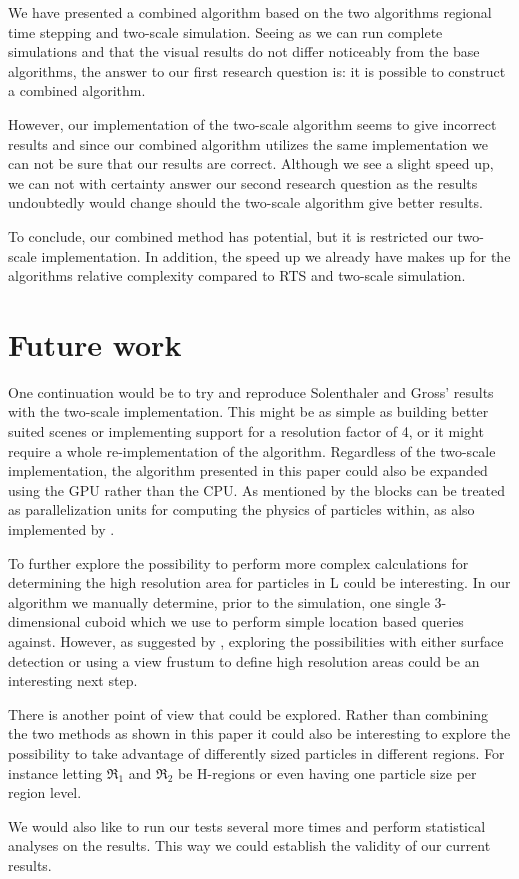 \documentclass[../../main.tex]{subfiles}
\begin{document}
\tracingall

We have presented a combined algorithm based on the two algorithms regional time stepping and two-scale simulation. Seeing as we can run complete simulations and that the visual results do not differ noticeably from the base algorithms, the answer to our first research question is: it is possible to construct a combined algorithm. 

However, our implementation of the two-scale algorithm seems to give incorrect results and since our combined algorithm utilizes the same implementation we can not be sure that our results are correct. Although we see a slight speed up, we can not with certainty answer our second research question as the results undoubtedly would change should the two-scale algorithm give better results. 

To conclude, our combined method has potential, but it is restricted our two-scale implementation. In addition, the speed up we already have makes up for the algorithms relative complexity compared to RTS and two-scale simulation. 


\section{Future work}

One continuation would be to try and reproduce Solenthaler and Gross' results with the two-scale implementation. This might be as simple as building better suited scenes or implementing support for a resolution factor of 4, or it might require a whole re-implementation of the algorithm. Regardless of the two-scale implementation, the algorithm presented in this paper could also be expanded using the GPU rather than the CPU. As mentioned by \citet{goswami2014regional} the blocks can be treated as parallelization units for computing the physics of particles within, as also implemented by \citet{goswami2010interactive}.

To further explore the possibility to perform more complex calculations for determining the high resolution area for particles in L could be interesting. In our algorithm we manually determine, prior to the simulation, one single 3-dimensional cuboid which we use to perform simple location based queries against. However, as suggested by \citet{solenthaler2011two}, exploring the possibilities with either surface detection or using a view frustum to define high resolution areas could be an interesting next step. 

There is another point of view that could be explored. Rather than combining the two methods as shown in this paper it could also be interesting to explore the possibility to take advantage of differently sized particles in different regions. For instance letting $\Re_1$ and $\Re_2$ be H-regions or even having one particle size per region level. 

We would also like to run our tests several more times and perform statistical analyses on the results. This way we could establish the validity of our current results. 

\end{document}
